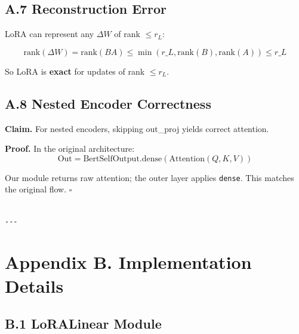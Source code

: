 \subsection{A.7 Reconstruction Error}

LoRA can represent any $\Delta W$ of rank $\leq r_L$:

\[
\text{rank}(\Delta W) = \text{rank}(BA) \leq \min(r\_L, \text{rank}(B), \text{rank}(A)) \leq r\_L
\tag{A.9}
\]

So LoRA is \textbf{exact} for updates of rank $\leq r_L$.

\subsection{A.8 Nested Encoder Correctness}

\textbf{Claim.} For nested encoders, skipping out\_proj yields correct attention.

\textbf{Proof.} In the original architecture:
\[
\text{Out} = \text{BertSelfOutput.dense}(\text{Attention}(Q, K, V))
\tag{A.10}
\]

Our module returns raw attention; the outer layer applies \texttt{dense}. This 
matches the original flow. $\square$
\begin{lstlisting}

---
\end{lstlisting}

\section{Appendix B. Implementation Details}

\subsection{B.1 LoRALinear Module}

